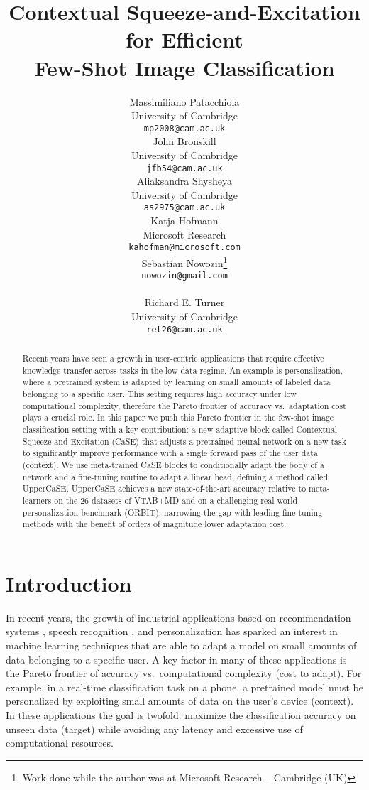 \documentclass{article}
\title{Contextual Squeeze-and-Excitation for Efficient\\
Few-Shot Image Classification}
\author{Massimiliano Patacchiola\\
  University of Cambridge\\
  \texttt{mp2008@cam.ac.uk} \\
   \And
   John Bronskill\\
   University of Cambridge\\
   \texttt{jfb54@cam.ac.uk}\\
   \And
   Aliaksandra Shysheya\\
   University of Cambridge\\
   \texttt{as2975@cam.ac.uk}\\
   \And
   Katja Hofmann\\
   Microsoft Research\\
   \texttt{kahofman@microsoft.com} \\
   \And
   Sebastian Nowozin\thanks{Work done while the author was at Microsoft Research -- Cambridge (UK)}\\
   \texttt{nowozin@gmail.com} \\
    \\
   \And
   Richard E. Turner\\
   University of Cambridge\\
   \texttt{ret26@cam.ac.uk}\\
}
\begin{document}
\maketitle


\begin{abstract}
  Recent years have seen a growth in user-centric applications that require effective knowledge transfer across tasks in the low-data regime. An example is personalization, where a pretrained system is adapted by learning on small amounts of labeled data belonging to a specific user. This setting requires high accuracy under low computational complexity, therefore the Pareto frontier of accuracy vs.~adaptation cost plays a crucial role. In this paper we push this Pareto frontier in the few-shot image classification setting with a key contribution: a new adaptive block called Contextual Squeeze-and-Excitation (CaSE) that adjusts a pretrained neural network on a new task to significantly improve performance with a single forward pass of the user data (context). We use meta-trained CaSE blocks to conditionally adapt the body of a network and a fine-tuning routine to adapt a linear head, defining a method called UpperCaSE. UpperCaSE achieves a new state-of-the-art accuracy relative to meta-learners on the 26 datasets of VTAB+MD and on a challenging real-world personalization benchmark (ORBIT), narrowing the gap with leading fine-tuning methods with the benefit of orders of magnitude lower adaptation cost.
\end{abstract}

\section{Introduction}

In recent years, the growth of industrial applications based on recommendation systems \citep{bennett2007netflix}, speech recognition \citep{xiong2018microsoft}, and personalization \citep{massiceti2021orbit} has sparked an interest in machine learning techniques that are able to adapt a model on small amounts of data belonging to a specific user. 
A key factor in many of these applications is the Pareto frontier of accuracy vs.~computational complexity (cost to adapt). For example, in a real-time classification task on a phone, a pretrained model must be personalized by exploiting small amounts of data on the user's device (context). In these applications the goal is twofold: maximize the classification accuracy on unseen data (target) while avoiding any latency and excessive use of computational resources.
\end{document}
